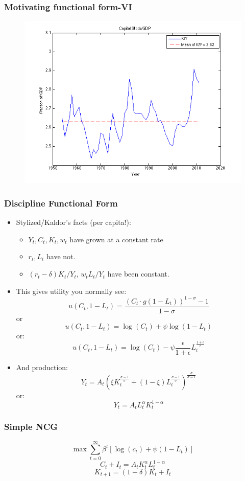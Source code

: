 \documentclass{beamer}
\begin{document}
\begin{frame}
\frametitle[alignment=center]{Motivating functional form-VI}
\begin{figure}
\centering
\includegraphics[scale=0.5]{KoverY}
\end{figure}
\end{frame}

\begin{frame}
\frametitle[alignment=center]{Discipline Functional Form}
\begin{itemize}
\item Stylized/Kaldor's facts (per capita!):
\begin{itemize}
\item $Y_t,C_t,K_t,w_t$ have grown at a constant rate
\item $r_t,L_t$ have not.
\item $(r_t-\delta)K_t/Y_t$, $w_tL_t/Y_t$ have been constant.
\end{itemize}
\item This gives utility you normally see:
$$u(C_t,1-L_t)=\frac{(C_t\cdot g(1-L_t))^{1-\sigma}-1}{1-\sigma}$$
or
$$u(C_t,1-L_t) = \log(C_t)+\psi \log(1-L_t)$$
or:
$$u(C_t,1-L_t) = \log(C_t)-\psi \frac{\epsilon}{1+\epsilon}L_t^{\frac{1+\epsilon}{\epsilon}}$$
\item And production:
$$Y_t=A_t\left(\xi K_t^\frac{\sigma-1}{\sigma}+(1-\xi) L_t^\frac{\sigma-1}{\sigma}\right)^\frac{\sigma}{\sigma-1}$$
or:
$$Y_t=A_tL_t^\alpha K_t^{1-\alpha}$$
\end{itemize}
\end{frame}

\begin{frame}
\frametitle[alignment=center]{Simple NCG}
$$\max\sum_{t=0}^\infty \beta^t\left[\log(c_t)+\psi\left(1-L_t\right)\right]$$
\bigskip
$$C_t+I_t=A_tK_t^\alpha L_t^{1-\alpha}$$
\bigskip
$$K_{t+1}=(1-\delta)K_t+I_t$$
\end{frame}
\end{document}
